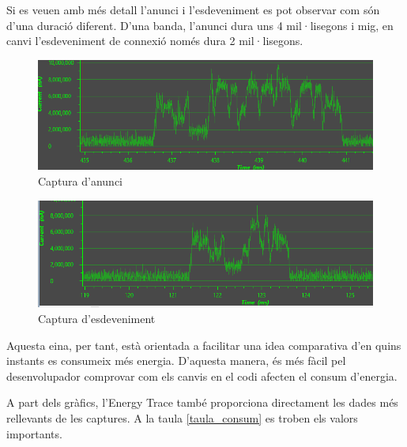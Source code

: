 Si es veuen amb més detall l'anunci i l'esdeveniment es pot observar com són d'una duració diferent.
D'una banda, l'anunci dura uns 4 mil·lisegons i mig, en canvi l'esdeveniment de connexió només dura 2 mil·lisegons.
\newline
\begin{figure}[!h]
	\begin{center}
		\includegraphics[width=\textwidth]{./images/pic_anunci_captura.png}
		\caption{Captura d'anunci}
		\label{energy_trace_adv}
	\end{center}
\end{figure}
\begin{figure}[!h]
	\begin{center}
		\includegraphics[width=\textwidth]{./images/pic_connectat_captura.png}
		\caption{Captura d'esdeveniment}
		\label{energy_trace_event}
	\end{center}
\end{figure}

Aquesta eina, per tant, està orientada a facilitar una idea comparativa d'en quins instants es consumeix més energia.
D'aquesta manera, és més fàcil pel desenvolupador comprovar com els canvis en el codi afecten el consum d'energia.

A part dels gràfics, l'Energy Trace també proporciona directament les dades més rellevants de les captures.
A la taula \ref{taula_consum} es troben els valors importants.\newline

